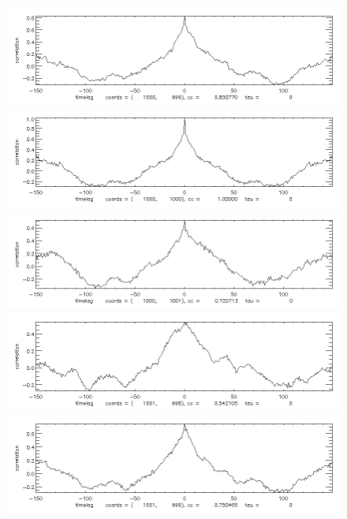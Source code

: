 \documentclass[12pt]{article}
\begin{document}
\begin{figure}[here]
\includegraphics[width=7in]{cc16.png}
\includegraphics[width=7in]{cc17.png}
\includegraphics[width=7in]{cc18.png}
\includegraphics[width=7in]{cc19.png}
\includegraphics[width=7in]{cc20.png}
\end{figure}
\newpage
\end{document}
